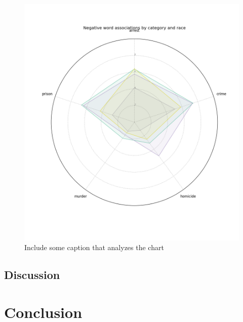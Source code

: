 \documentclass[sigconf]{acmart}
\begin{document}
\begin{figure}
\includegraphics[width=\columnwidth]{images/fig4.png}
\caption{Include some caption that analyzes the chart}
\label{Figure 4}
\end{figure}


\subsection{Discussion}

\section{Conclusion}
\end{document}
